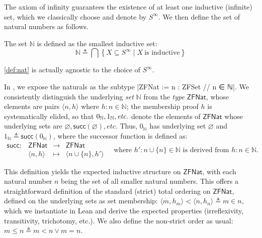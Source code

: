 The axiom of infinity guarantees the existence of at least one inductive (infinite) set, which we classically choose and denote by $S^{\infty}$.
We then define the set of natural numbers as follows.
%
\begin{definition}
  \label{def:nat}
  The set $\mathbb{N}$ is defined as the smallest inductive set:
  \[
    \mathbb{N} \triangleq \bigcap \left\{ X \subseteq S^{\infty} \mid X\ \text{is inductive} \right\}
  \]
\end{definition}
%
\begin{remark}
  \cref{def:nat} is actually agnostic to the choice of $S^{\infty}$.
\end{remark}
In \zflean, we expose the naturals as the subtype \leaninl|ZFNat := {n : ZFSet // n ∈ ℕ}|.
We consistently distinguish the underlying \emph{set} $\mathbb{N}$ from the \emph{type} $\mathsf{ZFNat}$, whose elements are pairs $\langle n, h\rangle$ where $h : n \in \mathbb{N}$; the membership proof $h$ is systematically elided, so that $0_{\mathbb{N}}, 1_{\mathbb{N}}, \textit{etc.}$ denote the elements of $\mathsf{ZFNat}$ whose underlying sets are $\varnothing, \mathsf{succ}(\varnothing), \mathit{etc.}$
Thus, $0_{\mathbb{N}}$ has underlying set $\varnothing$ and $1_{\mathbb{N}} \triangleq \mathsf{succ}(0_{\mathbb{N}})$, where the successor function is defined as:
\begin{equation*}
  \begin{matrix}
    \mathsf{succ} : & \mathsf{ZFNat}       & \to     & \mathsf{ZFNat}                   \\
                    & \langle n, h \rangle & \mapsto & \langle n \cup \{n\}, h' \rangle
  \end{matrix} \quad \text{where } h' : n \cup \{n\} \in \mathbb{N} \text{ is derived from } h : n \in \mathbb{N}.
\end{equation*}

This definition yields the expected inductive structure on $\mathsf{ZFNat}$, with each natural number $n$ being the set of all smaller natural numbers.
This offers a straightforward definition of the standard (strict) total ordering on $\mathsf{ZFNat}$, defined on the underlying sets as set membership: $\langle m, h_m \rangle < \langle n, h_n \rangle \triangleq m \in n$, which we instantiate in Lean and derive the expected properties (irreflexivity, transitivity, trichotomy, etc.). We also define the non-strict order as usual: $m \leq n \triangleq m < n \lor m = n$.

